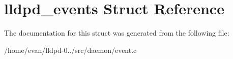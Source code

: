 \section{lldpd\-\_\-events \-Struct \-Reference}
\label{structlldpd__events}


\-The documentation for this struct was generated from the following file\-:\begin{DoxyCompactItemize}
\item 
/home/evan/lldpd-\/0../src/daemon/event.\-c\end{DoxyCompactItemize}
